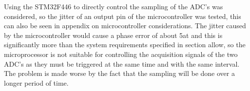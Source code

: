 Using the STM32F446 to directly control the sampling of the ADC's was considered, so the jitter of an output pin of the microcontroller was tested, this can also be seen in appendix  on microcontroller considerations. The jitter caused by the microcontroller would cause a phase error of about 5\degree at  and this is significantly more than the system requirements specified in section  allow, so the microprocessor is not suitable for controlling the acquisition signals of the two ADC's as they must be triggered at the same time and with the same interval. The problem is made worse by the fact that the sampling will be done over a longer period of time.


